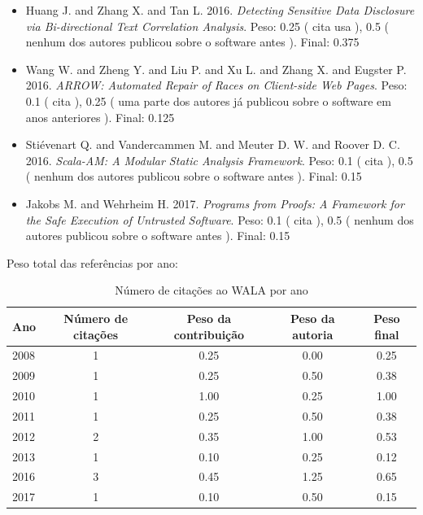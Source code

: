 \begin{itemize}
\item Huang J. and Zhang X. and Tan L.
      2016.
        \textit{ Detecting Sensitive Data Disclosure via Bi-directional Text Correlation Analysis}.
      Peso:
      0.25 (
          cita
          usa
      ),
      0.5 (
nenhum dos autores publicou sobre o software antes
      ).
      Final:
      0.375

\item Wang W. and Zheng Y. and Liu P. and Xu L. and Zhang X. and Eugster P.
      2016.
        \textit{ ARROW: Automated Repair of Races on Client-side Web Pages}.
      Peso:
      0.1 (
          cita
      ),
      0.25 (
uma parte dos autores já publicou sobre o software em anos anteriores
      ).
      Final:
      0.125

\item Stiévenart Q. and Vandercammen M. and Meuter D. W. and Roover D. C.
      2016.
        \textit{ Scala-AM: A Modular Static Analysis Framework}.
      Peso:
      0.1 (
          cita
      ),
      0.5 (
nenhum dos autores publicou sobre o software antes
      ).
      Final:
      0.15

\item Jakobs M. and Wehrheim H.
      2017.
        \textit{ Programs from Proofs: A Framework for the Safe Execution of Untrusted Software}.
      Peso:
      0.1 (
          cita
      ),
      0.5 (
nenhum dos autores publicou sobre o software antes
      ).
      Final:
      0.15

\end{itemize}

Peso total das referências por ano:

\begin{table}[h]
\caption{Número de citações ao WALA por ano}
\centering
\begin{tabular}{| l | c | c | c | c |}
  \hline
  Ano & Número de citações & Peso da contribuição & Peso da autoria & Peso final \\
  \hline
  2008
    & 1
    & 0.25
    & 0.00
    & 0.25 \\
  2009
    & 1
    & 0.25
    & 0.50
    & 0.38 \\
  2010
    & 1
    & 1.00
    & 0.25
    & 1.00 \\
  2011
    & 1
    & 0.25
    & 0.50
    & 0.38 \\
  2012
    & 2
    & 0.35
    & 1.00
    & 0.53 \\
  2013
    & 1
    & 0.10
    & 0.25
    & 0.12 \\
  2016
    & 3
    & 0.45
    & 1.25
    & 0.65 \\
  2017
    & 1
    & 0.10
    & 0.50
    & 0.15 \\
  \hline
\end{tabular}
\end{table}


